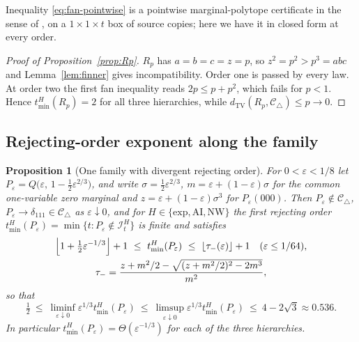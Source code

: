 \documentclass[11pt]{article}
\theoremstyle{plain}
\newtheorem{proposition}[theorem]{Proposition}
\theoremstyle{definition}
\DeclareMathOperator{\TV}{TV}
\newcommand{\Ctri}{\mathcal C_{\triangle}}
\newcommand{\eps}{\varepsilon}
\newcommand{\tmin}{t_{\min}}
\begin{document}
Inequality \eqref{eq:fan-pointwise} is a pointwise marginal-polytope certificate in the sense of \cite{WSF2019}, on a $1\times1\times t$ box of source copies; here we have it in closed form at every order.

\begin{proof}[Proof of Proposition~\ref{prop:Rp}]
$R_p$ has $a=b=c=z=p$, so $z^2=p^2>p^3=abc$ and Lemma~\ref{lem:finner} gives incompatibility. Order one is passed by every law. At order two the first fan inequality reads $2p\le p+p^2$, which fails for $p<1$. Hence $\tmin^H(R_p)=2$ for all three hierarchies, while $d_{\TV}(R_p,\Ctri)\le p\to0$.
\end{proof}

\subsection{Rejecting-order exponent along the family}\label{sec:exponent}


\begin{proposition}[One family with divergent rejecting order]\label{prop:family}
For $0<\eps<1/8$ let $P_\eps=Q\bigl(\eps,\,1-\tfrac12\eps^{2/3}\bigr)$, and write $\sigma=\tfrac12\eps^{2/3}$, $m=\eps+(1-\eps)\sigma$ for the common one-variable zero marginal and $z=\eps+(1-\eps)\sigma^3$ for $P_\eps(000)$. Then $P_\eps\notin\Ctri$, $P_\eps\to\delta_{111}\in\Ctri$ as $\eps\downarrow0$, and for $H\in\{\mathrm{exp},\mathrm{AI},\mathrm{NW}\}$ the first rejecting order $\tmin^H(P_\eps)=\min\{t:P_\eps\notin\mathcal I^H_t\}$ is finite and satisfies
\begin{gather*}
\Bigl\lfloor1+\tfrac12\eps^{-1/3}\Bigr\rfloor+1\ \le\ \tmin^H(P_\eps)\ \le\ \lfloor\tau_-(\eps)\rfloor+1\quad(\eps\le1/64),\\
\tau_-=\frac{z+m^2/2-\sqrt{(z+m^2/2)^2-2m^3}}{m^2},
\end{gather*}
so that
\[
\tfrac12\ \le\ \liminf_{\eps\downarrow0}\eps^{1/3}\tmin^H(P_\eps)\ \le\ \limsup_{\eps\downarrow0}\eps^{1/3}\tmin^H(P_\eps)\ \le\ 4-2\sqrt3\approx0.536 .
\]
In particular $\tmin^H(P_\eps)=\Theta(\eps^{-1/3})$ for each of the three hierarchies. \end{proposition}
\end{document}

